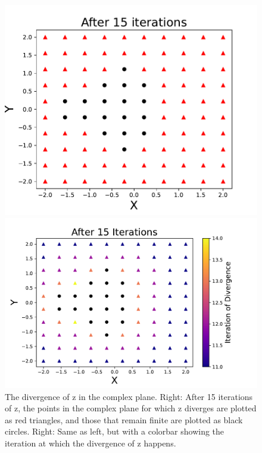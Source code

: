 \documentclass{article}
\begin{document}
\begin{figure}[ht!]
    \begin{minipage}{0.48\linewidth}
    \includegraphics[scale = 0.5]{Q1_Fig1.pdf} 
        \centering
    \end{minipage}
    \begin{minipage}{0.48\linewidth}
        \includegraphics[scale = 0.5]{Q1_Fig2.pdf}
        \centering
    \end{minipage}
    \caption{The divergence of z in the complex plane. Right: After 15 iterations of z, the points in the complex plane for which z diverges are plotted as red triangles, and those that remain finite are plotted as black circles. Right: Same as left, but with a colorbar showing the iteration at which the divergence of z happens.}
    \label{fig: Divergence_z_cplane}
\end{figure}
\end{document}
